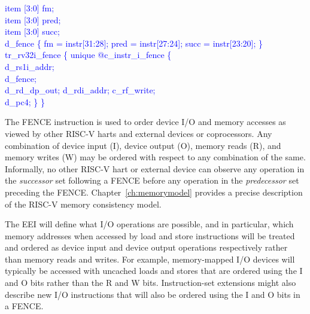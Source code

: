 \textcolor{blue}{
   item [3:0] fm;\\%
\indent item [3:0] pred;\\%
\indent item [3:0] succ;\\%
\indent d\_fence \{ fm = instr[31:28]; pred = instr[27:24]; succ = instr[23:20]; \}\\%
\indent tr\_rv32i\_fence \{ unique @c\_instr\_i\_fence \{ \\%
\indent \hspace{\parindent} d\_rs1i\_addr; \\%
\indent \hspace{\parindent} d\_fence; \\%
\indent \hspace{\parindent} d\_rd\_dp\_out; d\_rdi\_addr; c\_rf\_write;  \\%
\indent \hspace{\parindent} d\_pc4; \} \} \\%
}

The FENCE instruction is used to order device I/O and
memory accesses as viewed by other RISC-V harts and external devices
or coprocessors.  Any combination of device input (I), device output
(O), memory reads (R), and memory writes (W) may be ordered with
respect to any combination of the same.  Informally, no other RISC-V
hart or external device can observe any operation in the {\em
  successor} set following a FENCE before any operation in the {\em
  predecessor} set preceding the FENCE.
Chapter~\ref{ch:memorymodel} provides a precise description of the
RISC-V memory consistency model.
  
The EEI will define what I/O operations are possible, and in
particular, which memory addresses when accessed by load and store instructions will be treated and
ordered as device input and device output operations respectively
rather than memory reads and writes.  For example, memory-mapped I/O
devices will typically be accessed with uncached loads and stores that
are ordered using the I and O bits rather than the R and W bits.
Instruction-set extensions might also describe new I/O
instructions that will also be ordered using the I and O bits in a
FENCE.

